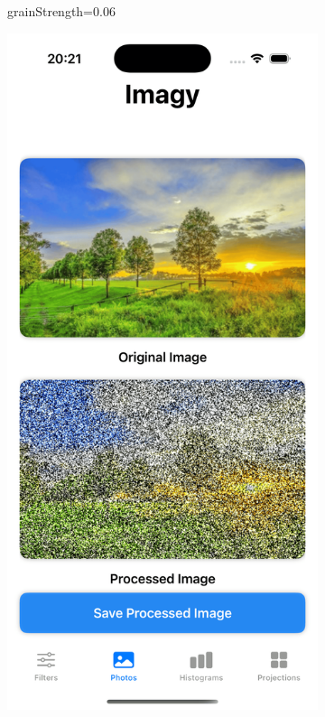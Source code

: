 \documentclass[a4paper]{article}
\begin{document}
\begin{figure}[H]
\begin{subfigure}{0.2\textwidth}
        \caption{grainStrength=0.06}
        \label{fig:trees_film_grain_0}
    \end{subfigure}
    \hfill
    \begin{subfigure}{0.2\textwidth}
        \centering
        \includegraphics[width=\linewidth]{images/trees_film_grain_1.0.png}

\end{subfigure}
\end{figure}
\end{document}
